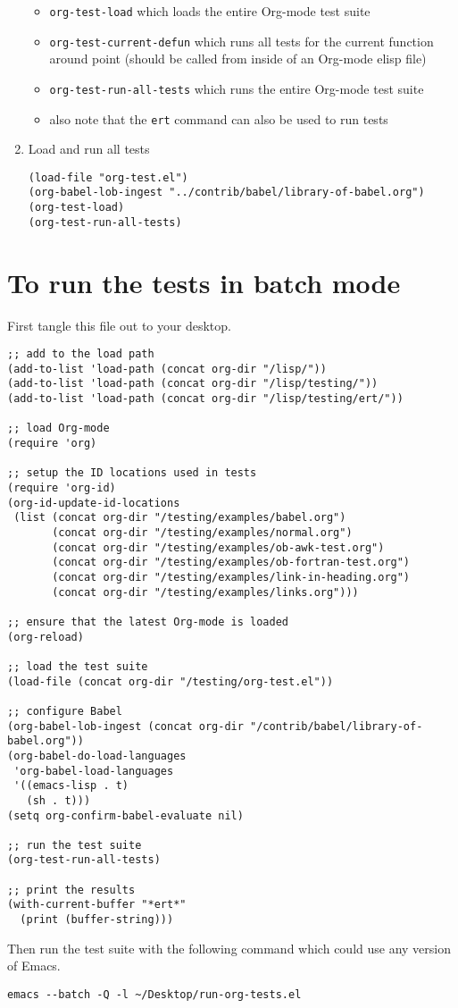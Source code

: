 \documentclass[11pt]{article}
\begin{document}
\begin{enumerate}
\begin{itemize}
\item \texttt{org-test-load} which loads the entire Org-mode test suite
\item \texttt{org-test-current-defun} which runs all tests for the current
     function around point (should be called from inside of an
     Org-mode elisp file)
\item \texttt{org-test-run-all-tests} which runs the entire Org-mode test suite
\item also note that the \texttt{ert} command can also be used to run tests
\end{itemize}

\item Load and run all tests

\begin{verbatim}
(load-file "org-test.el")
(org-babel-lob-ingest "../contrib/babel/library-of-babel.org")
(org-test-load)
(org-test-run-all-tests)
\end{verbatim}
\end{enumerate}
\section{To run the tests in batch mode}
\label{sec-2}

First tangle this file out to your desktop.

\begin{verbatim}
;; add to the load path
(add-to-list 'load-path (concat org-dir "/lisp/"))
(add-to-list 'load-path (concat org-dir "/lisp/testing/"))
(add-to-list 'load-path (concat org-dir "/lisp/testing/ert/"))

;; load Org-mode
(require 'org)

;; setup the ID locations used in tests
(require 'org-id)
(org-id-update-id-locations
 (list (concat org-dir "/testing/examples/babel.org")
       (concat org-dir "/testing/examples/normal.org")
       (concat org-dir "/testing/examples/ob-awk-test.org")
       (concat org-dir "/testing/examples/ob-fortran-test.org")
       (concat org-dir "/testing/examples/link-in-heading.org")
       (concat org-dir "/testing/examples/links.org")))

;; ensure that the latest Org-mode is loaded
(org-reload)

;; load the test suite
(load-file (concat org-dir "/testing/org-test.el"))

;; configure Babel
(org-babel-lob-ingest (concat org-dir "/contrib/babel/library-of-babel.org"))
(org-babel-do-load-languages
 'org-babel-load-languages
 '((emacs-lisp . t)
   (sh . t)))
(setq org-confirm-babel-evaluate nil)

;; run the test suite
(org-test-run-all-tests)

;; print the results
(with-current-buffer "*ert*"
  (print (buffer-string)))
\end{verbatim}



Then run the test suite with the following command which could use any
version of Emacs.

\begin{verbatim}
emacs --batch -Q -l ~/Desktop/run-org-tests.el
\end{verbatim}
\end{document}

